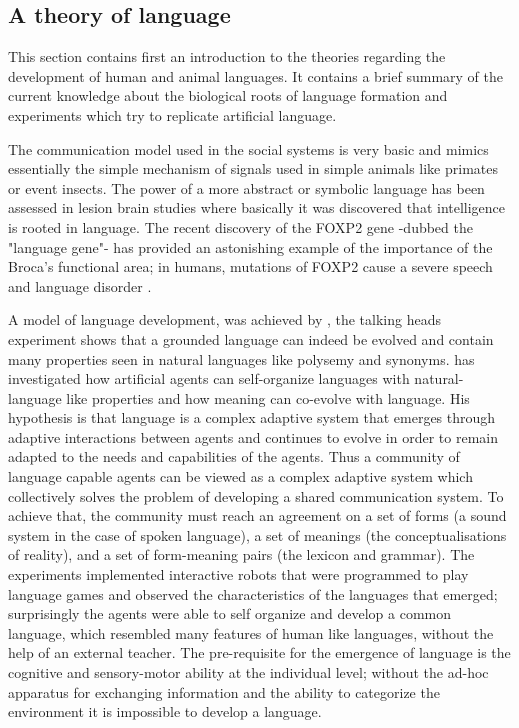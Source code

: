 \subsection{A theory of language}
\label{Conclusion:Language}

This section contains first an introduction to the theories regarding the development
of human and animal languages.
It contains a brief summary of the current knowledge about the biological
roots of language formation and experiments which try to replicate artificial
language.

The communication model used in the social systems is very basic and mimics essentially
the simple mechanism of signals used in simple animals like primates or event insects.
The power of a more abstract or symbolic language has been assessed in lesion brain
studies where basically it was discovered that intelligence is rooted in language.
The recent discovery of the FOXP2 gene -dubbed the "language gene"- has provided
an astonishing example of the importance of the Broca's functional area;
in humans, mutations of FOXP2 cause a severe speech and language
disorder \citep{FoxP2Gene:Nature:2001,FOXP2Identification:2005}.

A model of language development, was achieved by \citet{Steels:1998:OriginsOntologies,Steels:1999:TalkingHeads}, 
the talking heads experiment shows that a grounded language can indeed be
evolved and contain many properties seen in natural languages like polysemy and
synonyms.
\citet{Steels:1999:TalkingHeads} has investigated how artificial agents can self-organize
languages with natural-language like properties and how meaning can co-evolve
with language. His hypothesis is that language is a
complex adaptive system that emerges through adaptive interactions between
agents and continues to evolve in order to remain adapted to the needs and
capabilities of the agents.
Thus a community of language capable agents can be viewed as a complex adaptive
system which collectively solves the problem of developing a shared
communication system.
To achieve that, the community must reach an agreement on a set of forms
(a sound system in the case of spoken language), a set of meanings (the
conceptualisations of reality), and a set of form-meaning pairs (the
lexicon and grammar).
The experiments implemented interactive robots that were programmed to play language games and
observed the characteristics of the languages that emerged; surprisingly the
agents were able to self organize and develop a common language, which resembled many features of human like
languages, without the help of an external teacher. 
The pre-requisite for the emergence of language is the cognitive and
 sensory-motor ability at the individual level; without the ad-hoc apparatus for
exchanging information and the ability to categorize the environment it is impossible to develop a language.

